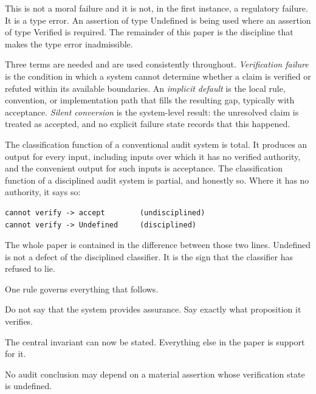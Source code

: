 \documentclass[smallcondensed,envcountsect,natbib]{svjour3}
\newcommand{\state}[1]{\textsf{#1}}
\begin{document}
This is not a moral failure and it is not, in the first instance, a regulatory failure. It is a type error. An assertion of type \state{Undefined} is being used where an assertion of type \state{Verified} is required. The remainder of this paper is the discipline that makes the type error inadmissible.

Three terms are needed and are used consistently throughout. \emph{Verification failure} is the condition in which a system cannot determine whether a claim is verified or refuted within its available boundaries. An \emph{implicit default} is the local rule, convention, or implementation path that fills the resulting gap, typically with acceptance. \emph{Silent conversion} is the system-level result: the unresolved claim is treated as accepted, and no explicit failure state records that this happened.

The classification function of a conventional audit system is total. It produces an output for every input, including inputs over which it has no verified authority, and the convenient output for such inputs is acceptance. The classification function of a disciplined audit system is partial, and honestly so. Where it has no authority, it says so:

\begin{lstlisting}
cannot verify -> accept        (undisciplined)
cannot verify -> Undefined     (disciplined)
\end{lstlisting}

The whole paper is contained in the difference between those two lines. \state{Undefined} is not a defect of the disciplined classifier. It is the sign that the classifier has refused to lie.

One rule governs everything that follows.

\begin{rul}
\label{rule:proposition}
Do not say that the system provides assurance. Say exactly what proposition it verifies.
\end{rul}

The central invariant can now be stated. Everything else in the paper is support for it.

\begin{rul}
\label{rule:invariant}
No audit conclusion may depend on a material assertion whose verification state is undefined.
\end{rul}
\end{document}
